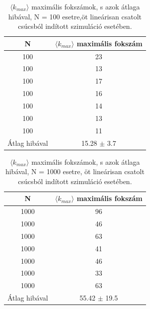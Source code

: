 \documentclass[a4paper, 12pt]{article}
\numberwithin{equation}{section}          %
\numberwithin{figure}{subsection}
\begin{document}
\begin{table}[ht!]
	\captionsetup{justification=centering}
	\begin{center}
		\begin{tabular}{||c|c||}
			\hline
			N & $\langle k_{max} \rangle$ maximális fokszám \\  \hline
			100 & 23 \\	\hline
			100 &13 \\	\hline
			100 & 17\\	\hline
			100 & 16\\	\hline
			100 & 14\\	\hline
			100 & 13\\	\hline
			100 & 11 \\	\hline
			Átlag hibával & 15.28 $\pm$ 3.7\\  \hline
		\end{tabular}
		\caption{$\langle k_{max} \rangle$ maximális fokszámok, s azok átlaga hibával, N = 100 esetre,öt lineárisan csatolt
			csúcsból indított szimuláció esetében.}
	\end{center}
\end{table}

\begin{table}[ht!]
	\captionsetup{justification=centering}
	\begin{center}
		\begin{tabular}{||c|c||}
			\hline
			N & $\langle k_{max} \rangle$ maximális fokszám \\  \hline
			1000 & 96 \\	\hline
			1000 &46 \\	\hline
			1000 &63\\	\hline
			1000 & 41\\	\hline
			1000 & 46\\	\hline
			1000 & 33\\	\hline
			1000 & 63 \\	\hline
			Átlag hibával & 55.42 $\pm$ 19.5\\  \hline
		\end{tabular}
		\caption{$\langle k_{max} \rangle$ maximális fokszámok, s azok átlaga hibával, N = 1000 esetre, öt lineárisan csatolt
			csúcsból indított szimuláció esetében.}
	\end{center}
\end{table}
\end{document}
